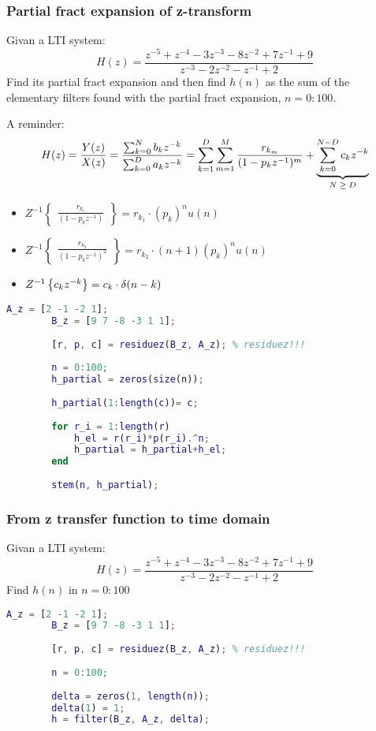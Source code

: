     \subsubsection{Partial fract expansion of z-transform}
    Givan a LTI system:
    $$
    H(z)=\frac{
        z^{-5}+z^{-4}-3z^{-3}-8z^{-2}+7z^{-1}+9
    }{
        z^{-3}-2z^{-2}-z^{-1}+2
    }
    $$
    Find its partial fract expansion and then find $h(n)$ as the sum of the elementary filters found with the partial fract expansion, $n=0:100$.
    
    A reminder:
    $$
    H(z)=\frac{Y(z)}{X(z)}=\frac{\sum_{k=0}^Nb_kz^{-k}}{\sum_{k=0}^Da_kz^{-k}}
    =
    \sum_{k=1}^D\sum_{m=1}^M\frac{
        r_{k_m}
    }{(1-p_kz^{-1})^m}+
    \underlabel{
        \sum_{k=0}^{N-D}c_kz^{-k}
    }{$N\geq D$}
    $$
    \begin{itemize}
        \item $Z^{-1}\begin{Bmatrix}
            \frac{r_{k_1}}{(1-p_kz^{-1})}
        \end{Bmatrix}=r_{k_1}\cdot (p_k)^nu(n)$
        \item $Z^{-1}\begin{Bmatrix}
            \frac{r_{k_2}}{(1-p_kz^{-1})^2}
        \end{Bmatrix}=r_{k_2}\cdot (n+1)(p_k)^nu(n)$
        \item $Z^{-1}\Brackets{c_kz^{-k}}=c_k\cdot \delta(n-k)$
    \end{itemize}
    \begin{lstlisting}[language=Matlab, escapeinside=`']
        A_z = [2 -1 -2 1];
        B_z = [9 7 -8 -3 1 1];
        
        [r, p, c] = residuez(B_z, A_z); % residuez!!!
        
        n = 0:100;
        h_partial = zeros(size(n));
        
        h_partial(1:length(c))= c;
        
        for r_i = 1:length(r)
            h_el = r(r_i)*p(r_i).^n;
            h_partial = h_partial+h_el;
        end
        
        stem(n, h_partial);
    \end{lstlisting}

    \subsubsection{From z transfer function to time domain}
    Givan a LTI system:
    $$
    H(z)=\frac{
        z^{-5}+z^{-4}-3z^{-3}-8z^{-2}+7z^{-1}+9
    }{
        z^{-3}-2z^{-2}-z^{-1}+2
    }
    $$
    Find $h(n)$ in $n=0:100$
    \begin{lstlisting}[language=Matlab, escapeinside=`']
        A_z = [2 -1 -2 1];
        B_z = [9 7 -8 -3 1 1];
        
        [r, p, c] = residuez(B_z, A_z); % residuez!!!
        
        n = 0:100;
        
        delta = zeros(1, length(n));
        delta(1) = 1;
        h = filter(B_z, A_z, delta);
    \end{lstlisting}

